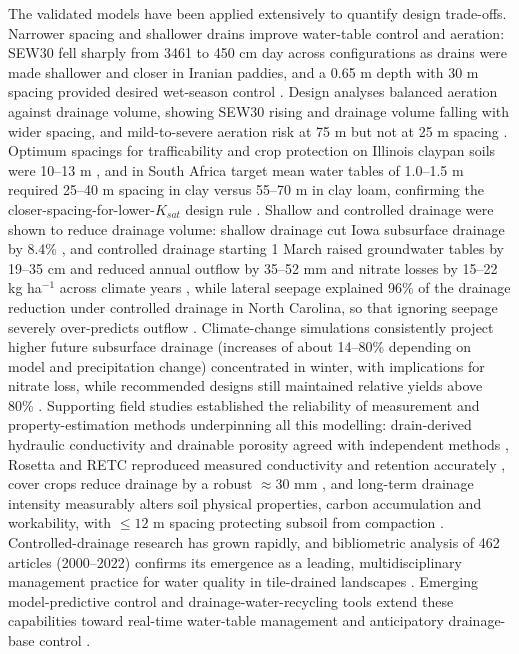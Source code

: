 The validated models have been applied extensively to quantify design trade-offs. Narrower spacing and shallower drains improve water-table control and aeration: SEW30 fell sharply from 3461 to 450 cm day across configurations as drains were made shallower and closer in Iranian paddies, and a 0.65 m depth with 30 m spacing provided desired wet-season control \parencite{DarziNaftchali2013,DarziNaftchally2014}. Design analyses balanced aeration against drainage volume, showing SEW30 rising and drainage volume falling with wider spacing, and mild-to-severe aeration risk at 75 m but not at 25 m spacing \parencite{Verma2014,Hirekhan2007}. Optimum spacings for trafficability and crop protection on Illinois claypan soils were 10--13 m \parencite{MOSTAGHIMI1989}, and in South Africa target mean water tables of 1.0--1.5 m required 25--40 m spacing in clay versus 55--70 m in clay loam, confirming the closer-spacing-for-lower-$K_{sat}$ design rule \parencite{Malota2015}. Shallow and controlled drainage were shown to reduce drainage volume: shallow drainage cut Iowa subsurface drainage by 8.4\% \parencite{Zhou2013,Mendez2004}, and controlled drainage starting 1 March raised groundwater tables by 19--35 cm and reduced annual outflow by 35--52 mm and nitrate losses by 15--22 kg ha$^{-1}$ across climate years \parencite{Kesicka2023}, while lateral seepage explained 96\% of the drainage reduction under controlled drainage in North Carolina, so that ignoring seepage severely over-predicts outflow \parencite{Youssef2021,Saadat2018,Österholm2015}. Climate-change simulations consistently project higher future subsurface drainage (increases of about 14--80\% depending on model and precipitation change) concentrated in winter, with implications for nitrate loss, while recommended designs still maintained relative yields above 80\% \parencite{Singh2009,Chen2016,Feng2018}. Supporting field studies established the reliability of measurement and property-estimation methods underpinning all this modelling: drain-derived hydraulic conductivity and drainable porosity agreed with independent methods \parencite{BUCKLAND1986}, Rosetta and RETC reproduced measured conductivity and retention accurately \parencite{Malota2022,Malota2024}, cover crops reduce drainage by a robust $\approx30$ mm \parencite{Meyer2019}, and long-term drainage intensity measurably alters soil physical properties, carbon accumulation and workability, with $\le12$ m spacing protecting subsoil from compaction \parencite{Omonode2025,Mante2022,Mante2018,Frison2009,Roy2020}. Controlled-drainage research has grown rapidly, and bibliometric analysis of 462 articles (2000--2022) confirms its emergence as a leading, multidisciplinary management practice for water quality in tile-drained landscapes \parencite{Kesicka2023b}. Emerging model-predictive control and drainage-water-recycling tools extend these capabilities toward real-time water-table management and anticipatory drainage-base control \parencite{Ikonen2023,Reinhart2020,VandeCraats2021,Ahmadi1995,HASEGAWA1994,GALLICHAND1992b,MCCARTHY1992,PalaciosVélez2004,Khan2007,Prathapar1996,Ghorbani2015,Skaggs2017,Singh2006,Singh1999,Gaj2022}.